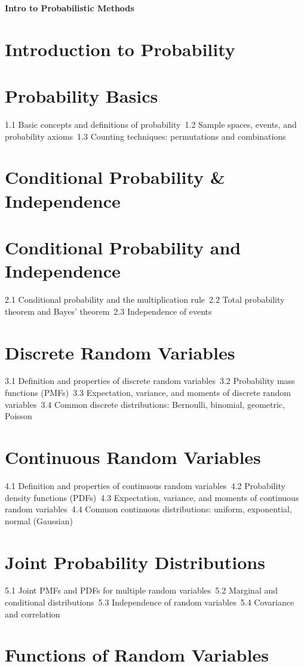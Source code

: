 {\LARGE \bf{Intro to Probabilistic Methods}}
\section{Introduction to Probability}
\section{Probability Basics}
1.1 Basic concepts and definitions of probability\
1.2 Sample spaces, events, and probability axioms\
1.3 Counting techniques: permutations and combinations\
\section{Conditional Probability \& Independence}
\section{Conditional Probability and Independence}
2.1 Conditional probability and the multiplication rule\
2.2 Total probability theorem and Bayes' theorem\
2.3 Independence of events\
\section{Discrete Random Variables}
3.1 Definition and properties of discrete random variables\
3.2 Probability mass functions (PMFs)\
3.3 Expectation, variance, and moments of discrete random variables\
3.4 Common discrete distributions: Bernoulli, binomial, geometric, Poisson\
\section{Continuous Random Variables}
4.1 Definition and properties of continuous random variables\
4.2 Probability density functions (PDFs)\
4.3 Expectation, variance, and moments of continuous random variables\
4.4 Common continuous distributions: uniform, exponential, normal (Gaussian)\
\section{Joint Probability Distributions}
5.1 Joint PMFs and PDFs for multiple random variables\
5.2 Marginal and conditional distributions\
5.3 Independence of random variables\
5.4 Covariance and correlation\
\section{Functions of Random Variables}
